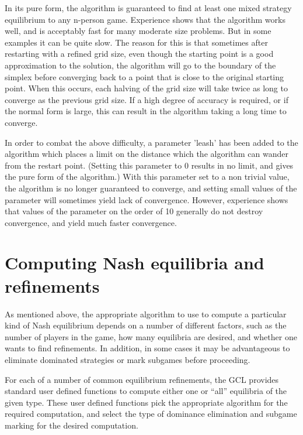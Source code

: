 In its pure form, the algorithm is guaranteed to find at least one
mixed strategy equilibrium to any n-person game.  Experience shows
that the algorithm works well, and is acceptably fast for many
moderate size problems.  But in some examples it can be quite slow.
The reason for this is that sometimes after restarting with a refined
grid size, even though the starting point is a good approximation to
the solution, the algorithm will go to the boundary of the simplex
before converging back to a point that is close to the original
starting point.  When this occurs, each halving of the grid size will
take twice as long to converge as the previous grid size.  If a high
degree of accuracy is required, or if the normal form is large, this
can result in the algorithm taking a long time to converge.

In order to combat the above difficulty, a parameter 'leash' has been
added to the algorithm which places a limit on the distance which the
algorithm can wander from the restart point. (Setting this parameter
to 0 results in no limit, and gives the pure form of the algorithm.)
With this parameter set to a non trivial value, the algorithm is no
longer guaranteed to converge, and setting small values of the
parameter will sometimes yield lack of convergence.  However,
experience shows that values of the parameter on the order of 10
generally do not destroy convergence, and yield much faster
convergence.

\section{Computing Nash equilibria and refinements}

As mentioned above, the appropriate algorithm to use to compute a
particular kind of Nash equilibrium depends on a number of different
factors, such as the number of players in the game, how many
equilibria are desired, and whether one wants to find refinements.  In
addition, in some cases it may be advantageous to eliminate dominated
strategies or mark subgames before proceeding.

For each of a number of common equilibrium refinements, the GCL
provides standard user defined functions to compute either one or ``all''
equilibria of the given type.  These user defined functions pick the
appropriate algorithm for the required computation, and select the
type of dominance elimination and subgame marking for the desired
computation.

